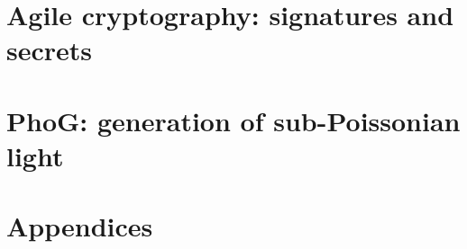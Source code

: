 \documentclass[ twoside,openright,titlepage,numbers=noenddot,%
                headinclude,footinclude,cleardoublepage=empty,abstract=on,
                BCOR=5mm,paper=a4,fontsize=11pt
                ]{scrreprt}
\begin{document}
\frenchspacing
\raggedbottom
{} %




\pagestyle{empty}

\cleardoublepage




\pagestyle{plain}
\setcounter{page}{1}


\cleardoublepage






\cleardoublepage
{}
\tableofcontents
\cleardoublepage




\setcounter{page}{1}
\pagestyle{scrheadings}

\setcounter{tocdepth}{1}

\part{Agile cryptography: signatures and secrets}




\part{PhoG: generation of sub-Poissonian light}


\part{Appendices}
\appendix









\printbibliography[heading=bibintoc]
\end{document}
